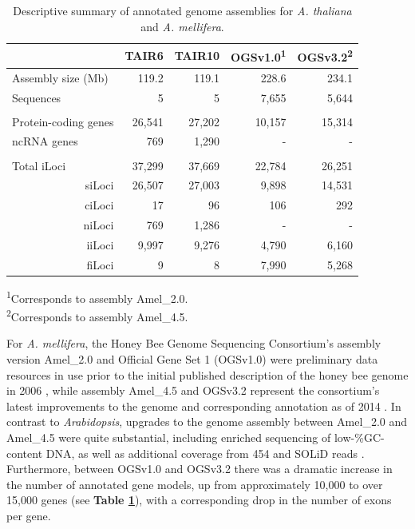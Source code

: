 \begin{table}[h]
\caption{Descriptive summary of annotated genome assemblies for \textit{A. thaliana} and \textit{A. mellifera}.}
\label{Table:AthaAmelSummary}
\begin{tabularx}{\textwidth}{lrrrr}
\hline
~                          & TAIR6  & TAIR10 & OGSv1.0\textsuperscript{1} & OGSv3.2\textsuperscript{2} \\ \hline
Assembly size (Mb)         & 119.2  & 119.1  & 228.6          & 234.1          \\
Sequences                  & 5      & 5      & 7,655          & 5,644          \\
                           &        &        &                &                \\
Protein-coding genes       & 26,541 & 27,202 & 10,157         & 15,314         \\
ncRNA genes                & 769    & 1,290  & -              & -              \\
                           &        &        &                &                \\
Total iLoci                & 37,299 & 37,669 & 22,784         & 26,251         \\
\multicolumn{1}{r}{siLoci} & 26,507 & 27,003 & 9,898          & 14,531         \\
\multicolumn{1}{r}{ciLoci} & 17     & 96     & 106            & 292            \\
\multicolumn{1}{r}{niLoci} & 769    & 1,286  & -              & -              \\
\multicolumn{1}{r}{iiLoci} & 9,997  & 9,276  & 4,790          & 6,160          \\
\multicolumn{1}{r}{fiLoci} & 9      & 8      & 7,990          & 5,268          \\ \hline
\end{tabularx}
\raggedright
{\scriptsize
\textsuperscript{1}Corresponds to assembly Amel\_2.0. \\
\textsuperscript{2}Corresponds to assembly Amel\_4.5.
}
\end{table}

For \textit{A. mellifera}, the Honey Bee Genome Sequencing Consortium's assembly version Amel\_2.0 and Official Gene Set 1 (OGSv1.0) were preliminary data resources in use prior to the initial published description of the honey bee genome in 2006 \cite{OGS1.0}, while assembly Amel\_4.5 and OGSv3.2 represent the consortium's latest improvements to the genome and corresponding annotation as of 2014 \cite{OGS3.2}.
In contrast to \textit{Arabidopsis}, upgrades to the genome assembly between Amel\_2.0 and Amel\_4.5 were quite substantial, including enriched sequencing of low-\%GC-content DNA, as well as additional coverage from 454 and SOLiD reads \cite{OGS3.2}.
Furthermore, between OGSv1.0 and OGSv3.2 there was a dramatic increase in the number of annotated gene models, up from approximately 10,000 to over 15,000 genes (see \textbf{Table \ref{Table:AthaAmelSummary}}), with a corresponding drop in the number of exons per gene.

